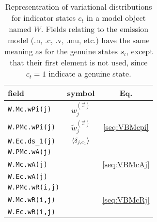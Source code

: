 \documentclass[11pt,letterpaper,twocolumn]{article}
\begin{document}
\begin{table}
\caption{Representration of variational distributions for indicator
  states $c_t$ in a model object named $W$. Fields relating to the
  emission model (.n, .c, .v, .mu, etc.) have the same meaning as for
  the genuine states $s_t$, except that their first element is not
  used, since $c_t=1$ indicate a genuine state.}\label{tab:QSparameters}
\begin{center}  
  \begin{tabular}{|l|c|c|}
    \hline
    field & symbol & Eq.\\
    \hline\hline
%
    \hline
    \verb+W.Mc.wPi(j)+& $w_j^{(\vec{\pi})}$    & \\ 
    \verb+W.PMc.wPi(j)+& $\tilde w_j^{(\vec{\pi})}$    & \eqref{seq:VBMcpi}\\ 
    \verb+W.Ec.ds_1(j)+& $\left\langle \delta_{j,c_1}\right\rangle$ & \\ 
    \hline
     \verb+W.PMc.wA(j)+& & \\ 
    \verb+W.Mc.wA(j)+& & \eqref{seq:VBMcAj}\\ 
    \verb+W.Ec.wA(j)+& &\\
    \hline
     \verb+W.PMc.wR(i,j)+& & \\ 
    \verb+W.Mc.wR(i,j)+& & \eqref{seq:VBMcRj}\\ 
    \verb+W.Ec.wR(i,j)+&& \\
    \hline
  \end{tabular}
\end{center}
\end{table}
   
\end{document}
